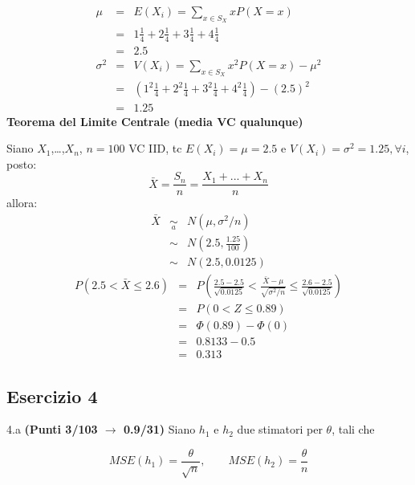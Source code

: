 \documentclass[
  11pt,
]{book}
\theoremstyle{mytheoremstyle}
\theoremstyle{mydefstyle}
\newenvironment{sol}
  {
  \begin{tcolorbox}[enhanced,breakable,arc=0.1mm,boxrule=1pt,colback=white,colframe=iblue,
  title=\bf \fontfamily{lmss}\selectfont \hspace{.5 cm} Soluzione,drop fuzzy shadow]

}{
\end{tcolorbox}
  }
\begin{document}
\begin{sol}
\begin{eqnarray*} \mu &=& E(X_i) = \sum_{x\in S_X}x P(X=x)\\ 
 &=&  1  \frac { 1 }{ 4 }+ 2  \frac { 1 }{ 4 }+ 3  \frac { 1 }{ 4 }+ 4  \frac { 1 }{ 4 } \\ 
            &=& 2.5 \\ 
 \sigma^2 &=& V(X_i) = \sum_{x\in S_X}x^2 P(X=x)-\mu^2\\ 
 &=&\left(  1  ^2\frac { 1 }{ 4 }+ 2  ^2\frac { 1 }{ 4 }+ 3  ^2\frac { 1 }{ 4 }+ 4  ^2\frac { 1 }{ 4 } \right)-( 2.5 )^2\\ 
            &=& 1.25 
\end{eqnarray*}
\textbf{Teorema del Limite Centrale (media VC qualunque)}

Siano \(X_1\),\ldots,\(X_n\), \(n=100\) VC IID, tc \(E(X_i)=\mu=2.5\) e \(V(X_i)=\sigma^2=1.25,\forall i\), posto:
\[
      \bar X=\frac{S_n}n =\frac{X_1 + ... + X_n}n
      \]
allora:\begin{eqnarray*}
  \bar X & \mathop{\sim}\limits_{a}& N(\mu,\sigma^2/n) \\
     &\sim & N\left(2.5,\frac{1.25}{100}\right) \\
     &\sim & N(2.5,0.0125)
  \end{eqnarray*}\begin{eqnarray*}
   P( 2.5 < \bar X \leq  2.6 ) &=& P\left( \frac { 2.5  -  2.5 }{\sqrt{ 0.0125 }} < \frac { \bar X  -  \mu }{ \sqrt{\sigma^2/n} } \leq \frac { 2.6  -  2.5 }{\sqrt{ 0.0125 }}\right)  \\
              &=& P\left(  0  < Z \leq  0.89 \right) \\
              &=& \Phi( 0.89 )-\Phi( 0 )\\
              &=&  0.8133 - 0.5 \\ 
              &=&  0.313 
   \end{eqnarray*}

\end{sol}

\subsection{Esercizio 4}\label{esercizio-4-16}

4.a \textbf{(Punti 3/103 \(\rightarrow\) 0.9/31)} Siano \(h_1\) e \(h_2\) due stimatori per \(\theta\), tali che

\[
  MSE(h_1) =  \frac{\theta}{\sqrt{n}}, \qquad  MSE(h_2) =  \frac{\theta}{n}
\]
\end{document}
